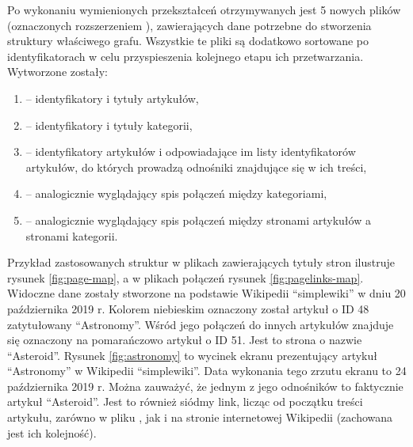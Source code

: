Po wykonaniu wymienionych przekształceń otrzymywanych jest 5 nowych plików (oznaczonych rozszerzeniem ), zawierających dane potrzebne do stworzenia struktury właściwego grafu. Wszystkie te pliki są dodatkowo sortowane po identyfikatorach w celu przyspieszenia kolejnego etapu ich przetwarzania. Wytworzone zostały:

\begin{enumerate}[label=\textbullet]
    \setlength\itemsep{1.1em}
    \item {} – identyfikatory i tytuły artykułów,
    \item {} – identyfikatory i tytuły kategorii,
    \item {} – identyfikatory artykułów i odpowiadające im listy identyfikatorów artykułów, do których prowadzą odnośniki znajdujące się w ich treści,
    \item {} – analogicznie wyglądający spis połączeń między kategoriami,
    \item {} – analogicznie wyglądający spis połączeń między stronami artykułów a stronami kategorii.
\end{enumerate}

Przykład zastosowanych struktur w plikach zawierających tytuły stron ilustruje rysunek \ref{fig:page-map}, a w plikach połączeń rysunek \ref{fig:pagelinks-map}. Widoczne dane zostały stworzone na podstawie Wikipedii ``simplewiki'' w dniu 20 października 2019 r. Kolorem niebieskim oznaczony został artykuł o ID 48 zatytułowany ``Astronomy''. Wśród jego połączeń do innych artykułów znajduje się oznaczony na pomarańczowo artykuł o ID 51. Jest to strona o nazwie ``Asteroid''. Rysunek \ref{fig:astronomy} to wycinek ekranu prezentujący artykuł ``Astronomy'' w Wikipedii ``simplewiki''. Data wykonania tego zrzutu ekranu to 24 października 2019 r. Można zauważyć, że jednym z jego odnośników to faktycznie artykuł ``Asteroid''. Jest to również siódmy link, licząc od początku treści artykułu, zarówno w pliku , jak i na stronie internetowej Wikipedii (zachowana jest ich kolejność).



